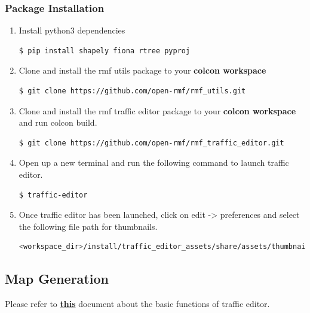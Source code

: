 \documentclass[11pt]{article}
\begin{document}
\subsubsection{Package Installation}
\begin{enumerate}
 \item{
       Install python3 dependencies
       \begin{lstlisting}[language=bash]
         $ pip install shapely fiona rtree pyproj
        \end{lstlisting}
       }
 \item {
       Clone and install the rmf utils package to your \textbf{colcon workspace}
       \begin{lstlisting}[language=bash]
        $ git clone https://github.com/open-rmf/rmf_utils.git
        \end{lstlisting}
       }
 \item {
       Clone and install the rmf traffic editor package to your \textbf{colcon workspace} and run colcon build.
       \begin{lstlisting}[language=bash]
         $ git clone https://github.com/open-rmf/rmf_traffic_editor.git
        \end{lstlisting}

       }
 \item {
       Open up a new terminal and run the following command to launch traffic editor.
       \begin{lstlisting}[language=bash]
         $ traffic-editor
        \end{lstlisting}
       }
 \item {
       Once traffic editor has been launched, click on edit -> preferences
       and select the following file path for thumbnails.
       \begin{lstlisting}[language=bash]
       <workspace_dir>/install/traffic_editor_assets/share/assets/thumbnails
        \end{lstlisting}
       }
\end{enumerate}
\subsection{Map Generation}
Please refer to
\href{ https://osrf.github.io/ros2multirobotbook/traffic-editor.html}{\textbf{this}} document about the basic functions of traffic editor.
\end{document}
